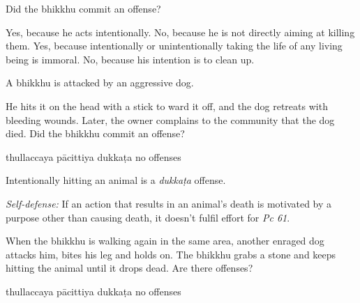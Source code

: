 \begin{exam}{\autoExamName}
\begin{problem}
  Did the bhikkhu commit an offense?

\bigskip

\begin{manswers}{1}
    \bChoices
     Yes, because he acts intentionally. \eAns
     No, because he is not directly aiming at killing them. \eAns
     Yes, because intentionally or unintentionally taking the life of any living being is immoral. \eAns
     No, because his intention is to clean up. \eAns
    \eChoices
\end{manswers}

\end{problem}

\problemDivide

\begin{problem*}

  A bhikkhu is attacked by an aggressive dog.

  \begin{parts}

    \item He hits it on the head with a stick to ward it off, and the dog retreats with bleeding wounds. Later, the owner complains to the community that the dog died. Did the bhikkhu commit an offense?

    \bigskip

    \begin{answers}{4}
      \bChoices
       thullaccaya \eAns
       pācittiya\eAns
       dukkaṭa\eAns
       no offenses\eAns
      \eChoices
    \end{answers}

    \begin{solution}
      Intentionally hitting an animal is a \emph{dukkaṭa} offense.

      \emph{Self-defense:} If an action that results in an animal's death is motivated by a purpose other than causing death, it doesn't fulfil effort for \emph{Pc 61}.
    \end{solution}

    \ifnosolutions
    \bigskip
    \else
    \clearpage
    \fi

    \item When the bhikkhu is walking again in the same area, another enraged dog attacks him, bites his leg and holds on. The bhikkhu grabs a stone and keeps hitting the animal until it drops dead. Are there offenses?

    \bigskip

    \begin{answers}{4}
      \bChoices
       thullaccaya \eAns
       pācittiya\eAns
       dukkaṭa\eAns
       no offenses\eAns
      \eChoices
    \end{answers}


\end{parts}
\end{problem*}
\end{exam}
